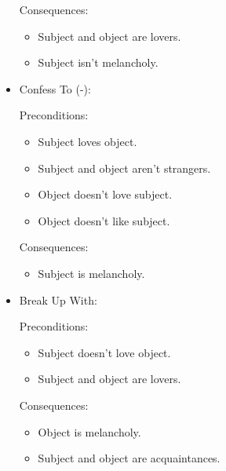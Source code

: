 \documentclass[12pt]{article}
\begin{document}
\begin{itemize}
    Consequences:
    \begin{itemize}
      \item Subject and object are lovers.
      \item Subject isn't melancholy.
    \end{itemize}

  \item Confess To (-):

    Preconditions:
    \begin{itemize}
      \item Subject loves object.
      \item Subject and object aren't strangers.
      \item Object doesn't love subject.
      \item Object doesn't like subject.
    \end{itemize}

    Consequences:
    \begin{itemize}
      \item Subject is melancholy.
    \end{itemize}

  \item Break Up With:

    Preconditions:
    \begin{itemize}
      \item Subject doesn't love object.
      \item Subject and object are lovers.
    \end{itemize}

    Consequences:
    \begin{itemize}
      \item Object is melancholy.
      \item Subject and object are acquaintances.
    \end{itemize}
\end{itemize}
\end{document}
